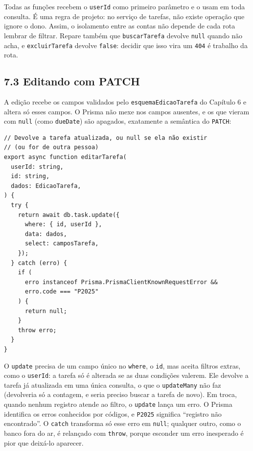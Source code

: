 Todas as funções recebem o \texttt{userId} como primeiro parâmetro e o usam em toda consulta. É uma regra de projeto: no serviço de tarefas, não existe operação que ignore o dono. Assim, o isolamento entre as contas não depende de cada rota lembrar de filtrar. Repare também que \texttt{buscarTarefa} devolve \texttt{null} quando não acha, e \texttt{excluirTarefa} devolve \texttt{false}: decidir que isso vira um \texttt{404} é trabalho da rota.

\subsection{7.3 Editando com PATCH}

A edição recebe os campos validados pelo \texttt{esquemaEdicaoTarefa} do Capítulo 6 e altera só esses campos. O Prisma não mexe nos campos ausentes, e os que vieram com \texttt{null} (como \texttt{dueDate}) são apagados, exatamente a semântica do \texttt{PATCH}:

\begin{codigo}
\begin{Verbatim}[breaklines=true, breaksymbolleft={}, fontsize=\footnotesize]
// Devolve a tarefa atualizada, ou null se ela não existir
// (ou for de outra pessoa)
export async function editarTarefa(
  userId: string,
  id: string,
  dados: EdicaoTarefa,
) {
  try {
    return await db.task.update({
      where: { id, userId },
      data: dados,
      select: camposTarefa,
    });
  } catch (erro) {
    if (
      erro instanceof Prisma.PrismaClientKnownRequestError &&
      erro.code === "P2025"
    ) {
      return null;
    }
    throw erro;
  }
}
\end{Verbatim}
\end{codigo}

O \texttt{update} precisa de um campo único no \texttt{where}, o \texttt{id}, mas aceita filtros extras, como o \texttt{userId}: a tarefa só é alterada se as duas condições valerem. Ele devolve a tarefa já atualizada em uma única consulta, o que o \texttt{updateMany} não faz (devolveria só a contagem, e seria preciso buscar a tarefa de novo). Em troca, quando nenhum registro atende ao filtro, o \texttt{update} lança um erro. O Prisma identifica os erros conhecidos por códigos, e \texttt{P2025} significa ``registro não encontrado''. O \texttt{catch} transforma só esse erro em \texttt{null}; qualquer outro, como o banco fora do ar, é relançado com \texttt{throw}, porque esconder um erro inesperado é pior que deixá-lo aparecer.

